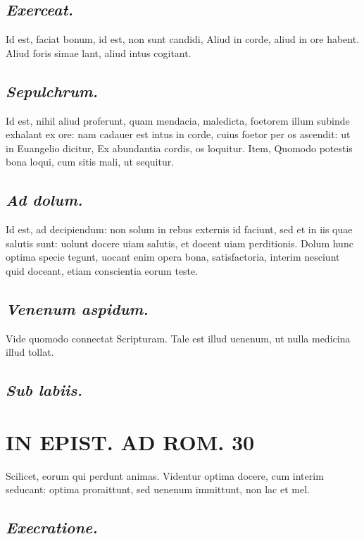 \documentclass{article}
\begin{document}
\begin{pages}
\subsection*{\textit{Exerceat. }}\pstart Id est, faciat bonum, id est, non sunt candidi, Aliud in corde, aliud in ore habent. Aliud foris simae lant, aliud intus cogitant.   \pend
{}
{}
\subsection*{\textit{Sepulchrum. }}\pstart Id est, nihil aliud proferunt, quam mendacia, maledicta, foetorem illum subinde exhalant ex ore: nam cadauer est intus in corde, cuius foetor per os ascendit: ut in Euangelio dicitur, Ex abundantia cordis, os loquitur. Item, Quomodo potestis bona loqui, cum sitis mali, ut sequitur.   \pend
{}
{}
\subsection*{\textit{Ad dolum. }}\pstart Id est, ad decipiendum: non solum in rebus externis id faciunt, sed et in iis quae salutis sunt: uolunt docere uiam salutis, et docent uiam perditionis. Dolum hunc optima specie tegunt, uocant enim opera bona, satisfactoria, interim nesciunt quid doceant, etiam conscientia eorum teste.   \pend
{}
{}
\subsection*{\textit{Venenum aspidum. }}\pstart Vide quomodo connectat Scripturam. Tale est illud uenenum, ut nulla medicina illud tollat.   \pend
{}
{}
\subsection*{\textit{Sub labiis. }}
\section*{IN EPIST. AD ROM.  30 }
\marginpar{[ p.]}\pstart Scilicet, eorum qui perdunt animas. Videntur optima docere, cum interim seducant: optima proraittunt, sed uenenum immittunt, non lac et mel.   \pend
{}
{}
\subsection*{\textit{Execratione. }}
{}

\end{pages}
\end{document}
